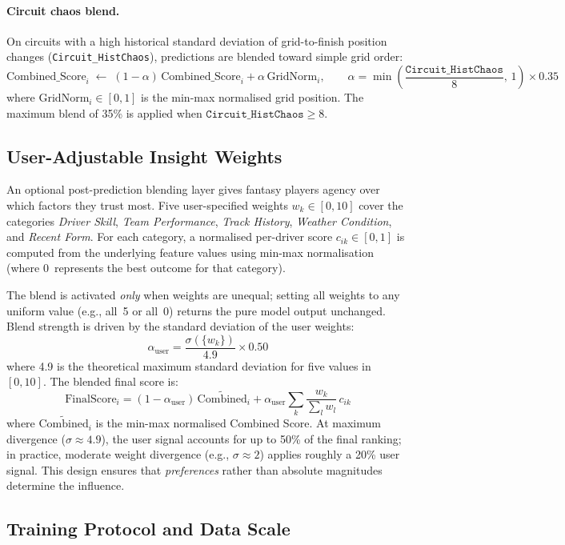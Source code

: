\documentclass[12pt, a4paper, oneside]{report}
\begin{document}
\paragraph{Circuit chaos blend.}
On circuits with a high historical standard deviation of grid-to-finish position
changes (\texttt{Circuit\_HistChaos}), predictions are blended toward simple
grid order:
\[
\text{Combined\_Score}_i \;\leftarrow\;
  (1-\alpha)\,\text{Combined\_Score}_i + \alpha\,\text{GridNorm}_i,
  \qquad
  \alpha = \min\!\left(\frac{\texttt{Circuit\_HistChaos}}{8},\,1\right)\times 0.35
\]
where $\text{GridNorm}_i \in [0,1]$ is the min-max normalised grid position.
The maximum blend of 35\% is applied when $\texttt{Circuit\_HistChaos} \geq 8$.

\subsection{User-Adjustable Insight Weights}
\label{subsec:user-weights}

An optional post-prediction blending layer gives fantasy players agency over
which factors they trust most. Five user-specified weights $w_k \in [0,10]$
cover the categories \emph{Driver Skill}, \emph{Team Performance},
\emph{Track History}, \emph{Weather Condition}, and \emph{Recent Form}.
For each category, a normalised per-driver score $c_{ik} \in [0,1]$ is computed
from the underlying feature values using min-max normalisation (where 0~represents
the best outcome for that category).

The blend is activated \emph{only} when weights are unequal; setting all weights
to any uniform value (e.g., all~5 or all~0) returns the pure model output
unchanged. Blend strength is driven by the standard deviation of the user weights:
\[
\alpha_{\text{user}} = \frac{\sigma(\{w_k\})}{4.9} \times 0.50
\]
where 4.9 is the theoretical maximum standard deviation for five values in
$[0,10]$. The blended final score is:
\[
\text{FinalScore}_i =
  (1-\alpha_{\text{user}})\,\widetilde{\text{Combined}}_i
  + \alpha_{\text{user}}\sum_{k} \frac{w_k}{\sum_l w_l}\,c_{ik}
\]
where $\widetilde{\text{Combined}}_i$ is the min-max normalised Combined Score.
At maximum divergence ($\sigma \approx 4.9$), the user signal accounts for up to
50\% of the final ranking; in practice, moderate weight divergence (e.g.,
$\sigma \approx 2$) applies roughly a 20\% user signal. This design ensures that
\emph{preferences} rather than absolute magnitudes determine the influence.

\subsection{Training Protocol and Data Scale}
\label{subsec:training}
\end{document}
